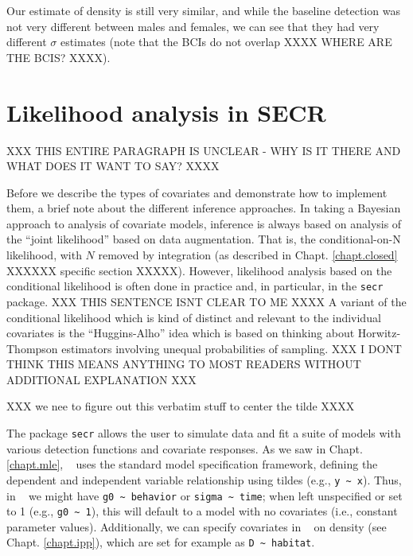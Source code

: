 Our estimate of density is still very similar, and while the baseline detection was not very different
between males and females, we can see that they had very different $\sigma$ estimates (note that the BCIs do not
overlap XXXX WHERE ARE THE BCIS? XXXX).  




\section{Likelihood analysis in SECR}

XXX THIS ENTIRE PARAGRAPH IS UNCLEAR - WHY IS IT THERE AND WHAT DOES IT WANT TO SAY? XXXX

Before we describe the types of covariates and demonstrate how to
implement them, a brief note about the different inference approaches.
In taking a Bayesian approach to analysis of covariate models,
inference is always based on analysis of the ``joint likelihood''
based on data augmentation. That is, the conditional-on-N likelihood,
with $N$ removed by integration (as described in
Chapt. \ref{chapt.closed} XXXXXX specific section XXXXX).
However, likelihood analysis
based on the conditional likelihood is often done in practice and, in
particular, in the {\tt secr} package. XXX THIS SENTENCE ISNT CLEAR TO ME XXXX A variant of the conditional
likelihood which is kind of distinct and relevant to the individual
covariates is the ``Huggins-Alho'' idea which is based on thinking
about Horwitz-Thompson estimators involving unequal probabilities of
sampling. XXX I DONT THINK THIS MEANS ANYTHING TO MOST READERS WITHOUT ADDITIONAL EXPLANATION XXX 



XXX we nee to figure out this verbatim stuff to center the tilde XXXX

The package \mbox{\tt secr} allows the user to simulate data and fit a
suite of models with various detection functions and covariate
responses.  As we saw in Chapt. \ref{chapt.mle}, \secr~ uses the standard \R model
specification framework, defining the dependent and independent
variable relationship using tildes
(e.g., \Verb+y ~ x+).
Thus, in \secr~ we
might have \verb+g0 ~ behavior+ or \verb+sigma ~ time+;
when left unspecified or set
to 1 (e.g., \verb+g0 ~ 1+), this will default to a model with no
covariates
(i.e., constant parameter values).
Additionally, we can specify covariates in \secr~
on density (see Chapt. \ref{chapt.ipp}),
which are set for example as \verb+D ~ habitat+.


